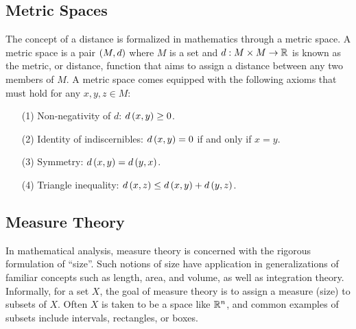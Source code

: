 \fi



\subsection{Metric Spaces}

The concept of a distance is formalized in mathematics through a metric space.
A metric space is a pair \(\left(M, d\right)\) where \(M\) is a set
and \(d : M \times M \to \mathbb{R}\) is known as the metric, or distance,
function that aims to assign a distance between any two members of \(M\).
A metric space comes equipped with the following axioms
that must hold for any \(x, y, z \in M\):
\begin{enumerate}
  \item[(1)]
    Non-negativity of \(d\): \(d\left(x, y\right) \geq 0\).

  \item[(2)]
    Identity of indiscernibles:
    \(d\left(x, y\right) = 0\) if and only if \(x = y\).

  \item[(3)]
    Symmetry:
    \(d\left(x, y\right) = d\left(y, x\right)\).

  \item[(4)]
    Triangle inequality:
    \(d\left(x, z\right) \leq d\left(x, y\right) + d\left(y, z\right)\).

\end{enumerate}


\begin{example}
\end{example}


\subsection{Measure Theory}

In mathematical analysis, measure theory is concerned with
the rigorous formulation of ``size''.
Such notions of size have application in generalizations of
familiar concepts such as length, area, and volume,
as well as integration theory.
Informally, for a set \(X\),
the goal of measure theory is to assign a measure (size) to subsets of \(X\).
Often \(X\) is taken to be a space like \(\mathbb{R}^n\),
and common examples of subsets include intervals, rectangles, or boxes.


